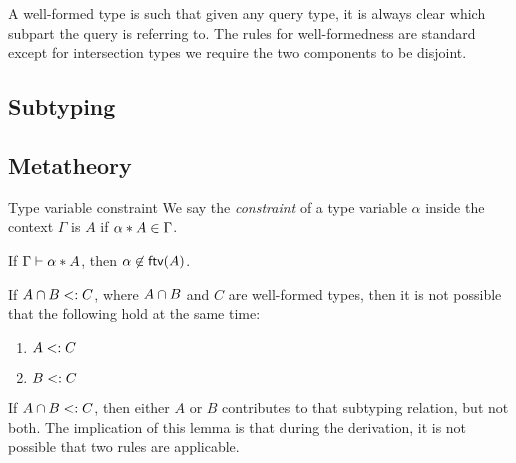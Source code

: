 \documentclass[nocopyrightspace,preprint,times,9pt]{sigplanconf}
\begin{document}
A well-formed type is such that given any query type, it is always clear which subpart the query is referring to. The rules for well-formedness are standard except for intersection types we require the two components to be disjoint.

\subsection{Subtyping}

\subsection{Metatheory}

\begin{definition}{Type variable constraint}
We say the \emph{constraint} of a type variable $\alpha$ inside the context $\Gamma$ is $A$ if $\alpha * A \in \Gamma$.
\end{definition}

%

\begin{lemma} \label{free-var-disjoint-bounds}
  If $\Gamma \vdash \alpha * A$, then $\alpha \not \in \textsf{ftv}(A)$.
\end{lemma}

\begin{lemma} \label{unique-subtype-contributor}
If $A \cap B <: C$, where $A \cap B$ and $C$ are well-formed types, then it is not possible that the following hold at the same time:
\begin{enumerate}
\item $A <: C$
\item $B <: C$
\end{enumerate}
\end{lemma}

If $A \cap B <: C$, then either $A$ or $B$ contributes to that subtyping relation, but not both. The implication of this lemma is that during the derivation, it is not possible that two rules are applicable.
\end{document}
